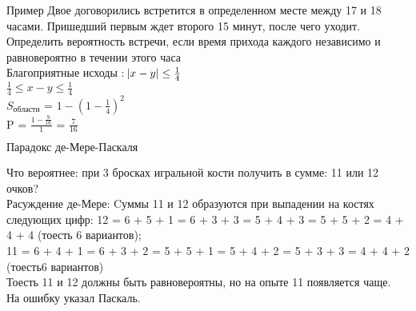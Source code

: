 \documentclass[russian, 12pt]{article}
\begin{document}
$\textbf{Пример}$ Двое договорились встретится в определенном месте между 17 и 18 часами. Пришедший первым ждет второго 15 минут, после чего уходит. Определить вероятность встречи, если время прихода каждого независимо и равновероятно в течении этого часа\\
Благоприятные исходы : $\abs{x - y} \leq \frac{1}{4}$\\
$\frac{1}{4} \leq x - y \leq \frac{1}{4}$\\	
$S_{области}$ = $1 - {(1 - \frac{1}{4})}^2$\\
P = $\frac{1 - \frac{9}{16}}{1}$ = $\frac{7}{16}$
\begin{center}
$\textbf{Парадокс де-Мере-Паскаля }$
\end{center}
Что вероятнее: при 3 бросках игральной кости получить в сумме: 11 или 12 очков?\\
Расуждение де-Мере: Cуммы 11 и 12 образуются при выпадении на костях следующих цифр: 12 =  6 +  5 + 1 = 6 + 3 + 3 = 5 + 4 + 3 = 5 + 5 + 2 = 4 + 4 + 4 (тоесть 6 вариантов);\\
11 =  6 + 4 + 1 = 6 + 3 + 2 = 5 + 5 + 1 = 5 + 4 + 2 = 5 + 3 + 3 = 4 + 4 + 2 (тоесть6 вариантов)\\
Тоесть 11 и 12 должны быть равновероятны, но на опыте 11 появляется чаще.\\
На ошибку указал Паскаль. 
\end{document}
